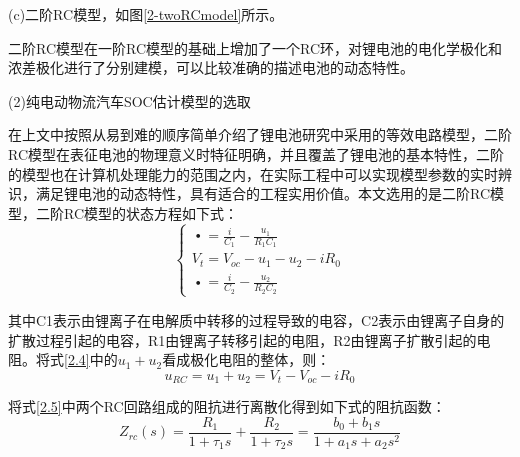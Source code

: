 (c)二阶RC模型，如图\ref{2-twoRCmodel}所示。

二阶RC模型在一阶RC模型的基础上增加了一个RC环，对锂电池的电化学极化和浓差极化进行了分别建模，可以比较准确的描述电池的动态特性。

(2)纯电动物流汽车SOC估计模型的选取

在上文中按照从易到难的顺序简单介绍了锂电池研究中采用的等效电路模型，二阶RC模型在表征电池的物理意义时特征明确，并且覆盖了锂电池的基本特性，二阶的模型也在计算机处理能力的范围之内，在实际工程中可以实现模型参数的实时辨识，满足锂电池的动态特性，具有适合的工程实用价值。本文选用的是二阶RC模型，二阶RC模型的状态方程如下式：
\begin{equation}\label{2.4}
\left\{ \begin{array}{l}
\mathop {{u_1}}\limits^ \bullet   = \frac{i}{{{C_1}}} - \frac{{{u_1}}}{{{R_1}{C_1}}}\\
{V_t} = {V_{oc}} - {u_1} - {u_2} - i{R_0}\\
\mathop {{u_2}}\limits^ \bullet   = \frac{i}{{{C_2}}} - \frac{{{u_2}}}{{{R_2}{C_2}}}
\end{array} \right.
\end{equation}

其中C1表示由锂离子在电解质中转移的过程导致的电容，C2表示由锂离子自身的扩散过程引起的电容，R1由锂离子转移引起的电阻，R2由锂离子扩散引起的电阻。将式\ref{2.4}中的${u_1} + {u_2}$看成极化电阻的整体，则：
\begin{equation}\label{2.5}
{u_{RC}} = {u_1} + {u_2} = {V_t} - {V_{oc}} - i{R_0}
\end{equation}

将式\ref{2.5}中两个RC回路组成的阻抗进行离散化得到如下式的阻抗函数：
\begin{equation}
{Z_{rc}}(s) = \frac{{{R_1}}}{{1 + {\tau _1}s}} + \frac{{{R_2}}}{{1 + {\tau _2}s}} = \frac{{{b_0} + {b_1}s}}{{1 + {a_1}s + {a_2}{s^2}}}
\end{equation}

